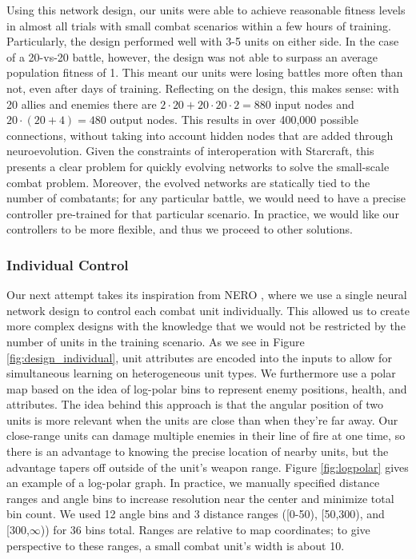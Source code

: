 \documentclass[10pt,a4paper,twocolumn]{article}
\begin{document}
Using this network design, our units were able to achieve reasonable fitness levels in almost all trials with small combat scenarios within a few hours of training. Particularly, the design performed well with 3-5 units on either side. In the case of a 20-vs-20 battle, however, the design was not able to surpass an average population fitness of 1. This meant our units were losing battles more often than not, even after days of training. Reflecting on the design, this makes sense: with 20 allies and enemies there are $2 \cdot 20 + 20\cdot 20 \cdot 2 = 880$ input nodes and $20 \cdot (20 + 4) = 480$ output nodes. This results in over 400,000 possible connections, without taking into account hidden nodes that are added through neuroevolution. Given the constraints of interoperation with Starcraft, this presents a clear problem for quickly evolving networks to solve the small-scale combat problem. Moreover, the evolved networks are statically tied to the number of combatants; for any particular battle, we would need to have a precise controller pre-trained for that particular scenario. In practice, we would like our controllers to be more flexible, and thus we proceed to other solutions.

\subsubsection{Individual Control}
\label{sec:individual_design}

Our next attempt takes its inspiration from NERO \cite{stanley:ieeetec05}, where we use a single neural network design to control each combat unit individually. This allowed us to create more complex designs with the knowledge that we would not be restricted by the number of units in the training scenario. As we see in Figure \ref{fig:design_individual}, unit attributes are encoded into the inputs to allow for simultaneous learning on heterogeneous unit types. We furthermore use a polar map based on the idea of log-polar bins to represent enemy positions, health, and attributes. The idea behind this approach is that the angular position of two units is more relevant when the units are close than when they're far away. Our close-range units can damage multiple enemies in their line of fire at one time, so there is an advantage to knowing the precise location of nearby units, but the advantage tapers off outside of the unit's weapon range. Figure \ref{fig:logpolar} gives an example of a log-polar graph. In practice, we manually specified distance ranges and angle bins to increase resolution near the center and minimize total bin count. We used 12 angle bins and 3 distance ranges ([0-50), [50,300), and [300,$\infty$)) for 36 bins total. Ranges are relative to map coordinates; to give perspective to these ranges, a small combat unit's width is about 10.
\end{document}
